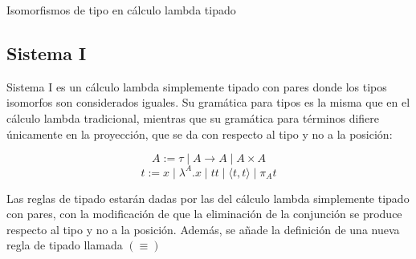 \begin{table}[H]
\begin{minipage}{0.7\linewidth}
	\end{minipage}
	\caption{Isomorfismos de tipo en cálculo lambda tipado}
\end{table}

\subsection{Sistema I}

Sistema I \cite{system-i} es un cálculo lambda simplemente tipado con pares donde los tipos isomorfos son considerados iguales.
Su gramática para tipos es la misma que en el cálculo lambda tradicional, mientras que su gramática para términos difiere únicamente en la proyección, que se da con respecto al tipo y no a la posición:

\[ A := \tau \mid A \rightarrow A \mid A \times A \]
\[ t := x \mid \lambda^A.x \mid t t \mid \langle t, t \rangle \mid \pi_A t \]

Las reglas de tipado estarán dadas por las del cálculo lambda simplemente tipado con pares, con la modificación de que la eliminación de la conjunción se produce respecto al tipo y no a la posición.
Además, se añade la definición de una nueva regla de tipado llamada $(\equiv)$

